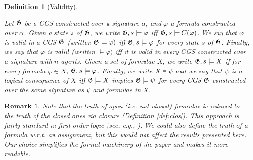 \documentclass{article}
\newcommand{\rem}[1]{{\color{red} #1}}
\newtheorem{definition}{Definition}
\newtheorem{remark}{Remark}
\begin{document}
\begin{definition}[Validity]\label{def:satopen}

Let $\mathfrak{G}$ be a CGS constructed over a signature $\alpha$, and $\varphi$ a formula constructed over $\alpha$. Given a state $s$ of $\mathfrak{G}$,
    we write $\mathfrak{G},s\models \varphi$ iff $\mathfrak{G},s\models C(\varphi)$. We say that $\varphi$ is \emph{valid in a CGS} $\mathfrak{G}$ (written $\mathfrak{G}\models \varphi)$ iff $\mathfrak{G},s\models \varphi$ for every state $s$ of $\mathfrak{G}$. Finally, we say that $\varphi$ is $\emph{valid}$ (written $\models \varphi)$ iff it is valid in every CGS constructed over a signature with $n$ agents. Given a set of formulae $X$, we write $\mathfrak{G},s \models X$  if for every  formula $\varphi\in X$, $\mathfrak{G}, s\models \varphi$. Finally, we write $X\models \psi$ and we say that $\psi$ is a logical consequence of $X$ iff $\mathfrak{G}\models X$ implies $\mathfrak{G}\models \psi$ for every CGS $\mathfrak{G}$ constructed over the same signature as $\psi$ and formulae  in $X$. %
\end{definition}


\begin{remark}\label{remark:open}
    Note that the truth of open (i.e. not closed) formulae is reduced to the truth of the closed ones via closure (Definition \ref{def:clos}). This approach is fairly standard in first-order logic (see, e.g., \cite{vandalen}). We could also define the truth of a formula w.r.t. an assignment, but this would not affect the results presented here. Our choice simplifies the formal machinery of the paper and makes it more readable. 
\end{remark}


  

    
\end{document}

